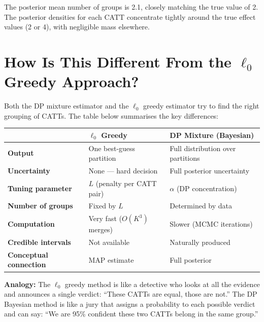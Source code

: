 \documentclass[12pt]{article}
\begin{document}
The posterior mean number of groups is 2.1, closely matching the true value of
2. The posterior densities for each CATT concentrate tightly around the true
effect values (2 or 4), with negligible mass elsewhere.

\section{How Is This Different From the $\ell_0$ Greedy Approach?}

Both the DP mixture estimator and the $\ell_0$ greedy estimator try to find
the right grouping of CATTs. The table below summarises the key differences:

\begin{center}
\begin{tabular}{p{4.5cm} p{4.5cm} p{4.5cm}}
\toprule
 & \textbf{$\ell_0$ Greedy} & \textbf{DP Mixture (Bayesian)} \\
\midrule
\textbf{Output} & One best-guess partition & Full distribution over partitions \\
\addlinespace
\textbf{Uncertainty} & None --- hard decision & Full posterior uncertainty \\
\addlinespace
\textbf{Tuning parameter} & $L$ (penalty per CATT pair) & $\alpha$ (DP concentration) \\
\addlinespace
\textbf{Number of groups} & Fixed by $L$ & Determined by data \\
\addlinespace
\textbf{Computation} & Very fast ($O(K^3)$ merges) & Slower (MCMC iterations) \\
\addlinespace
\textbf{Credible intervals} & Not available & Naturally produced \\
\addlinespace
\textbf{Conceptual connection} & MAP estimate & Full posterior \\
\bottomrule
\end{tabular}
\end{center}

\begin{intuitionbox}
\textbf{Analogy:} The $\ell_0$ greedy method is like a detective who looks at
all the evidence and announces a single verdict: ``These CATTs are equal, those
are not.'' The DP Bayesian method is like a jury that assigns a probability to
each possible verdict and can say: ``We are 95\% confident these two CATTs
belong in the same group.''
\end{intuitionbox}
\end{document}
